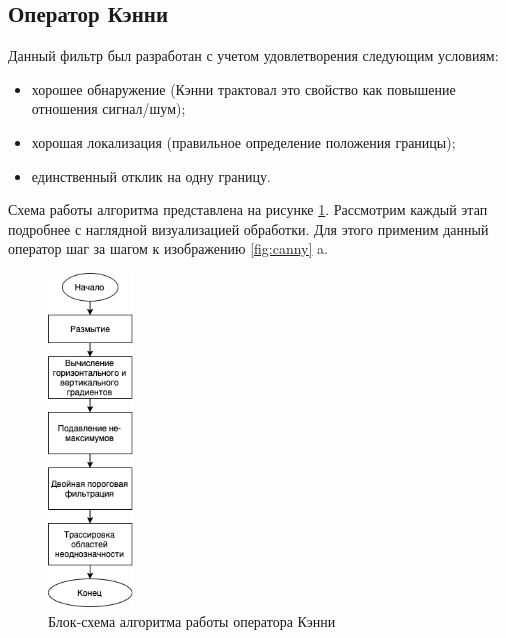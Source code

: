\subsection{Оператор Кэнни}

Данный фильтр\cite{Canny} был разработан с учетом удовлетворения следующим условиям:
\begin{itemize}
	\item хорошее обнаружение (Кэнни трактовал это свойство как повышение отношения сигнал/шум);
	\item хорошая локализация (правильное определение положения границы);
	\item единственный отклик на одну границу.
\end{itemize}

Схема  работы алгоритма представлена на рисунке \ref{fig:canny_block}. Рассмотрим каждый этап подробнее с наглядной визуализацией обработки. Для этого применим данный оператор шаг за шагом к изображению \ref{fig:canny} a.
\begin{figure}[!h]
	\centering
	\includegraphics[width=0.2\textwidth,keepaspectratio]{figures/ru/canny-block}
	\caption{Блок-схема алгоритма работы оператора Кэнни}
	\label{fig:canny_block}
\end{figure}

